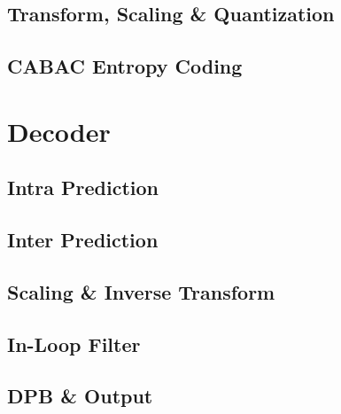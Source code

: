 \subsection{Transform, Scaling \& Quantization}


\subsection{CABAC Entropy Coding}


\section{Decoder}


\subsection{Intra Prediction}


\subsection{Inter Prediction}


\subsection{Scaling \& Inverse Transform}


\subsection{In-Loop Filter}


\subsection{DPB \& Output}
